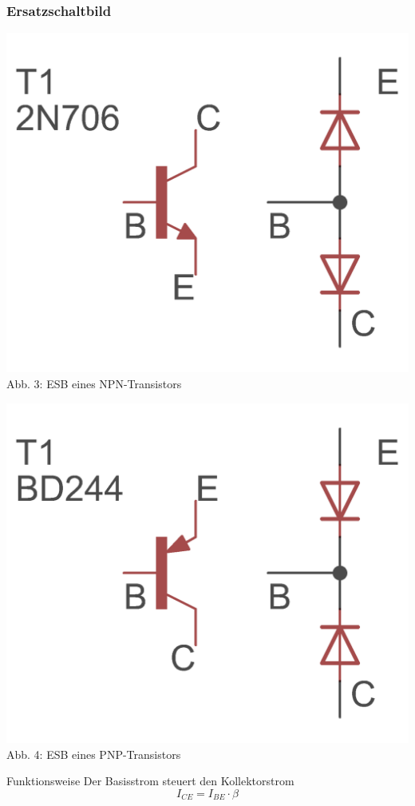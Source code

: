 \begin{frame}
\frametitle{Ersatzschaltbild}

\begin{minipage}{0.4\textwidth}
	\includegraphics[scale=1.4]{e13/NPN_esb.png}\\
	Abb. 3: ESB eines NPN-Transistors
\end{minipage}
\hspace{0.5cm}
\begin{minipage}{0.4\textwidth}
	\includegraphics[scale=1.4]{e13/PNP_esb.png}\\
	Abb. 4: ESB eines PNP-Transistors
\end{minipage}

\begin{center}
\begin{block}{Funktionsweise}
Der Basisstrom steuert den Kollektorstrom
$$I_{CE} = I_{BE} \cdot \beta$$
\end{block}
\end{center}
\end{frame}

